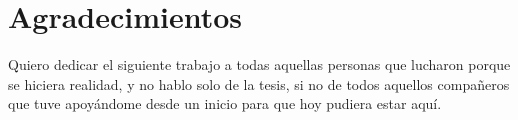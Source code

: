 \chapter*{Agradecimientos}
Quiero dedicar el siguiente trabajo a todas aquellas personas que lucharon porque se hiciera realidad, y no hablo solo de la tesis, si no de todos aquellos compañeros que tuve apoyándome desde un inicio para que hoy pudiera estar aquí.
